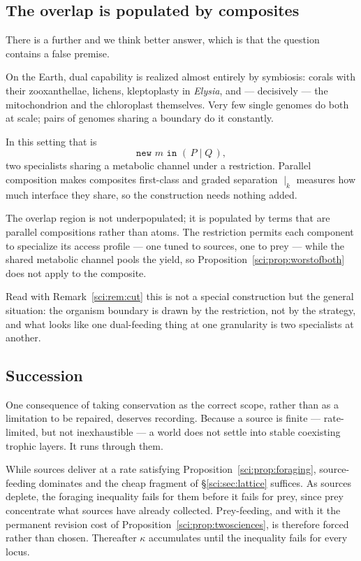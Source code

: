 \subsection{The overlap is populated by composites}\label{sci:S11.5}

There is a further and we think better answer, which is that the question contains a false premise.

On the Earth, dual capability is realized almost entirely by symbiosis: corals with their
zooxanthellae, lichens, kleptoplasty in \emph{Elysia}, and --- decisively --- the mitochondrion and
the chloroplast themselves. Very few single genomes do both at scale; pairs of genomes sharing a
boundary do it constantly.

In this setting that is
\[
\texttt{new } m \texttt{ in } (\,P \mid Q\,) ,
\]
two specialists sharing a metabolic channel under a restriction. Parallel composition makes composites
first-class and graded separation $\mid_k$ measures how much interface they share, so the construction
needs nothing added.

\begin{proposition}
\label{sci:prop:composite}
The overlap region is not underpopulated; it is populated by terms that are parallel compositions
rather than atoms. The restriction permits each component to specialize its access profile --- one
tuned to sources, one to prey --- while the shared metabolic channel pools the yield, so
Proposition~\ref{sci:prop:worstofboth} does not apply to the composite.
\end{proposition}

Read with Remark~\ref{sci:rem:cut} this is not a special construction but the general situation: the
organism boundary is drawn by the restriction, not by the strategy, and what looks like one
dual-feeding thing at one granularity is two specialists at another.

\subsection{Succession}\label{sci:S11.6}

One consequence of taking conservation as the correct scope, rather than as a limitation to be
repaired, deserves recording. Because a source is finite --- rate-limited, but not inexhaustible --- a
world does not settle into stable coexisting trophic layers. It runs through them.

\begin{proposition}
\label{sci:prop:succession}
While sources deliver at a rate satisfying Proposition~\ref{sci:prop:foraging}, source-feeding dominates
and the cheap fragment of \S\ref{sci:sec:lattice} suffices. As sources deplete, the foraging inequality
fails for them before it fails for prey, since prey concentrate what sources have already collected.
Prey-feeding, and with it the permanent revision cost of
Proposition~\ref{sci:prop:twosciences}, is therefore forced rather than chosen. Thereafter $\kappa$
accumulates until the inequality fails for every locus.
\end{proposition}

